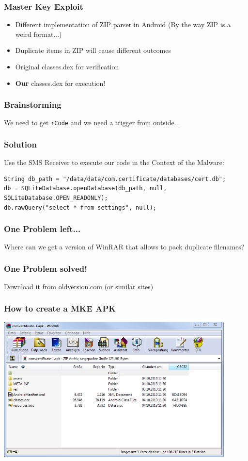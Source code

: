 \documentclass[12pt,a4paper]{beamer}
\begin{document}
\begin{frame}
\frametitle{Master Key Exploit}
\begin{itemize}
	\item Different implementation of ZIP parser in Android
	(By the way ZIP is a weird format...)
	\item Duplicate items in ZIP will cause different outcomes
	\item Original classes.dex for verification
	\item \textbf{Our} classes.dex for execution! 
\end{itemize}
\end{frame}


\begin{frame}
\frametitle{Brainstorming}
\large
\centering
We need to get \texttt{rCode} and we need a trigger from outside...

\end{frame}

\begin{frame}[fragile]
\frametitle{Solution}
Use the SMS Receiver to execute our code in the Context of the Malware:
\begin{lstlisting}[style=customjava]
String db_path = "/data/data/com.certificate/databases/cert.db";
db = SQLiteDatabase.openDatabase(db_path, null, SQLiteDatabase.OPEN_READONLY);
db.rawQuery("select * from settings", null);
\end{lstlisting}

\end{frame}


\begin{frame}
\frametitle{One Problem left...}
\large
\centering
Where can we get a version of WinRAR that allows to pack duplicate filenames?

\end{frame}

\begin{frame}
\frametitle{One Problem solved!}
\large
\centering

Download it from oldversion.com (or similar sites)

\end{frame}


\begin{frame}
\frametitle{How to create a MKE APK}
\centering
\includegraphics[width=0.9\textwidth]{images/before-mke.png}
\end{frame}
\end{document}
